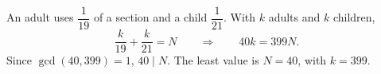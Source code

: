 An adult uses $\dfrac{1}{19}$ of a section and a child $\dfrac{1}{21}$. With $k$ adults and $k$ children,
\[\dfrac{k}{19}+\dfrac{k}{21}=N\qquad\Longrightarrow\qquad40k=399N.\]
Since $\gcd(40,399)=1$, $40\mid N$. The least value is $N=\boxed{40}$, with $k=399$.

